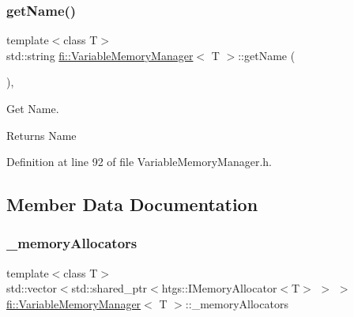 \mbox{\label{classfi_1_1VariableMemoryManager_a24ad349fc12308a924d62ecd2b37b4ad}} 
\subsubsection{\texorpdfstring{get\+Name()}{getName()}}
{\footnotesize\ttfamily template$<$class T$>$ \\
std\+::string \hyperlink{classfi_1_1VariableMemoryManager}{fi\+::\+Variable\+Memory\+Manager}$<$ T $>$\+::get\+Name (\begin{DoxyParamCaption}{ }\end{DoxyParamCaption})\hspace{0.3cm}{\ttfamily [inline]}, {\ttfamily [override]}}



Get Name. 

\begin{DoxyReturn}{Returns}
Name 
\end{DoxyReturn}


Definition at line 92 of file Variable\+Memory\+Manager.\+h.



\subsection{Member Data Documentation}
\mbox{\label{classfi_1_1VariableMemoryManager_a408610d37510b46d4f7a81bda0060135}} 
\subsubsection{\texorpdfstring{\+\_\+memory\+Allocators}{\_memoryAllocators}}
{\footnotesize\ttfamily template$<$class T$>$ \\
std\+::vector$<$std\+::shared\+\_\+ptr$<$htgs\+::\+I\+Memory\+Allocator$<$T$>$ $>$ $>$ \hyperlink{classfi_1_1VariableMemoryManager}{fi\+::\+Variable\+Memory\+Manager}$<$ T $>$\+::\+\_\+memory\+Allocators\hspace{0.3cm}{\ttfamily [private]}}



